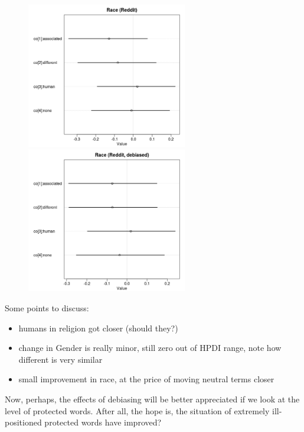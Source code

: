 \documentclass[12pt,]{book}
\begin{document}
\begin{center}
\begin{figure}[!htb]
   
  \begin{minipage}{0.55\textwidth}
\includegraphics[width=7cm]{../images/raceCoeffs.jpeg}
\end{minipage}
   \begin {minipage}{0.43\textwidth}
    \includegraphics[width=7cm]{../images/debiasedRaceRedditCoeffs.jpeg}
   \end{minipage}
\end{figure}

\end{center}


Some points to discuss:

\begin{itemize}
\item
  humans in religion got closer (should they?)
\item
  change in Gender is really minor, still zero out of HPDI range, note
  how different is very similar
\item
  small improvement in race, at the price of moving neutral terms closer
\end{itemize}

Now, perhaps, the effects of debiasing will be better appreciated if we
look at the level of protected words. After all, the hope is, the
situation of extremely ill-positioned protected words have improved?
\end{document}
